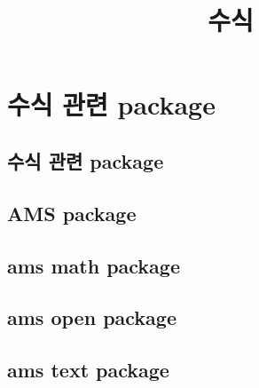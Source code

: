 \documentclass[12pt,a4paper]{report}
\begin{document}
		\title{수식}
		\maketitle

		\dominitoc		
		
		\newpage
		\tableofcontents
		
		
		\listoffigures
		\listoftables
		
		\doublespace
		\setcounter{secnumdepth}{3}
		\setlength{\parindent}{0cm}
		
		
\newpage
\chapter{수식 관련 package}
	
		\minitoc		
		
%
%
%
\newpage
\section{수식 관련 package}

\newpage
\section{AMS package}




\newpage
\section{ams math package}



\newpage
\section{ams open package}


\newpage
\section{ams text package}
\end{document}
